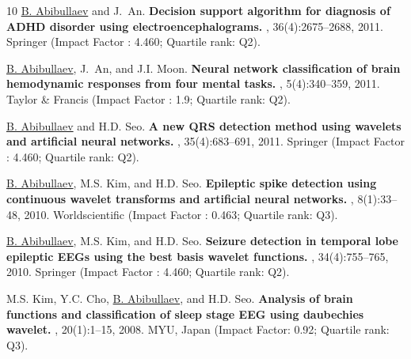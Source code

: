 \documentclass[10pt,letterpaper,sans]{moderncv}   %
\begin{document}
\begin{thebibliography}{10}
	\underline{B. Abibullaev} and J.~An.
	\newblock \textbf{Decision support algorithm for diagnosis of {ADHD} disorder using electroencephalograms.}
	, 36(4):2675--2688, 2011. Springer (Impact Factor : 4.460; Quartile rank: Q2).
	
	\underline{B. Abibullaev}, J.~An, and J.I. Moon.
	\newblock \textbf{Neural network classification of brain hemodynamic responses from four mental tasks.} , 5(4):340--359, 2011. Taylor \&  Francis (Impact Factor : 1.9; Quartile rank: Q2).
	
	\underline{B. Abibullaev} and H.D. Seo.
	\newblock \textbf{A new {QRS} detection method using wavelets and artificial neural networks.} , 35(4):683--691, 2011. Springer (Impact Factor : 4.460; Quartile rank: Q2).
	
	\underline{B. Abibullaev}, M.S. Kim, and H.D. Seo.
	\newblock \textbf{Epileptic spike detection using continuous wavelet transforms and artificial neural networks.} , 8(1):33--48, 2010.  Worldscientific (Impact Factor : 0.463; Quartile rank: Q3).
	
	\underline{B. Abibullaev}, M.S. Kim, and H.D. Seo.
	\newblock \textbf{Seizure detection in temporal lobe epileptic {EEGs} using the best basis wavelet functions.} , 34(4):755--765, 2010. Springer (Impact Factor : 4.460; Quartile rank: Q2).
	
	M.S. Kim, Y.C. Cho, \underline{B. Abibullaev}, and H.D. Seo.
	\newblock \textbf{Analysis of brain functions and classification of sleep stage {EEG} using daubechies wavelet.} , 20(1):1--15, 2008. MYU, Japan (Impact Factor: 0.92; Quartile rank: Q3).
	
\end{thebibliography}
\vspace{0.2cm}
\end{document}
